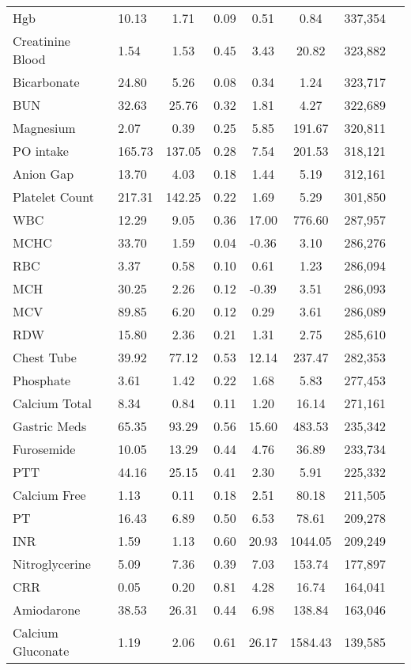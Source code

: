 \begin{longtable}{p{3.5cm}lcccccc}
Hgb & 10.13 & 1.71 & 0.09 & 0.51 & 0.84 & 337,354 \\
Creatinine Blood & 1.54 & 1.53 & 0.45 & 3.43 & 20.82 & 323,882 \\
Bicarbonate & 24.80 & 5.26 & 0.08 & 0.34 & 1.24 & 323,717 \\
BUN & 32.63 & 25.76 & 0.32 & 1.81 & 4.27 & 322,689 \\
Magnesium & 2.07 & 0.39 & 0.25 & 5.85 & 191.67 & 320,811 \\
PO intake & 165.73 & 137.05 & 0.28 & 7.54 & 201.53 & 318,121 \\
Anion Gap & 13.70 & 4.03 & 0.18 & 1.44 & 5.19 & 312,161 \\
Platelet Count & 217.31 & 142.25 & 0.22 & 1.69 & 5.29 & 301,850 \\
WBC & 12.29 & 9.05 & 0.36 & 17.00 & 776.60 & 287,957 \\
MCHC & 33.70 & 1.59 & 0.04 & -0.36 & 3.10 & 286,276 \\
RBC & 3.37 & 0.58 & 0.10 & 0.61 & 1.23 & 286,094 \\
MCH & 30.25 & 2.26 & 0.12 & -0.39 & 3.51 & 286,093 \\
MCV & 89.85 & 6.20 & 0.12 & 0.29 & 3.61 & 286,089 \\
RDW & 15.80 & 2.36 & 0.21 & 1.31 & 2.75 & 285,610 \\
Chest Tube & 39.92 & 77.12 & 0.53 & 12.14 & 237.47 & 282,353 \\
Phosphate & 3.61 & 1.42 & 0.22 & 1.68 & 5.83 & 277,453 \\
Calcium Total & 8.34 & 0.84 & 0.11 & 1.20 & 16.14 & 271,161 \\
Gastric Meds & 65.35 & 93.29 & 0.56 & 15.60 & 483.53 & 235,342 \\
Furosemide & 10.05 & 13.29 & 0.44 & 4.76 & 36.89 & 233,734 \\
PTT & 44.16 & 25.15 & 0.41 & 2.30 & 5.91 & 225,332 \\
Calcium Free & 1.13 & 0.11 & 0.18 & 2.51 & 80.18 & 211,505 \\
PT & 16.43 & 6.89 & 0.50 & 6.53 & 78.61 & 209,278 \\
INR & 1.59 & 1.13 & 0.60 & 20.93 & 1044.05 & 209,249 \\
Nitroglycerine & 5.09 & 7.36 & 0.39 & 7.03 & 153.74 & 177,897 \\
CRR & 0.05 & 0.20 & 0.81 & 4.28 & 16.74 & 164,041 \\
Amiodarone & 38.53 & 26.31 & 0.44 & 6.98 & 138.84 & 163,046 \\
Calcium Gluconate & 1.19 & 2.06 & 0.61 & 26.17 & 1584.43 & 139,585 \\

\end{longtable}
